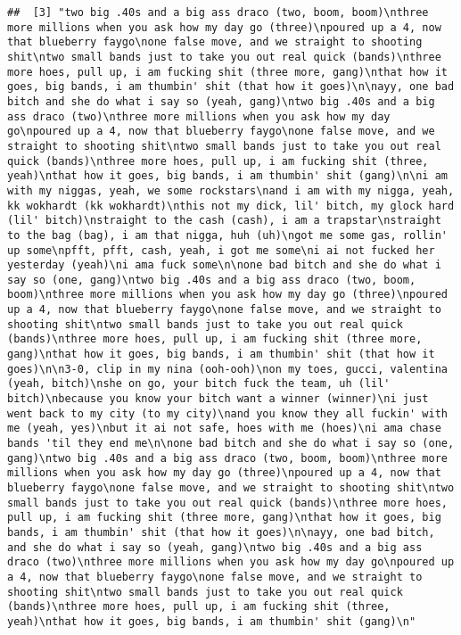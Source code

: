 \documentclass[]{article}
\begin{document}
\begin{verbatim}
##  [3] "two big .40s and a big ass draco (two, boom, boom)\nthree more millions when you ask how my day go (three)\npoured up a 4, now that blueberry faygo\none false move, and we straight to shooting shit\ntwo small bands just to take you out real quick (bands)\nthree more hoes, pull up, i am fucking shit (three more, gang)\nthat how it goes, big bands, i am thumbin' shit (that how it goes)\n\nayy, one bad bitch and she do what i say so (yeah, gang)\ntwo big .40s and a big ass draco (two)\nthree more millions when you ask how my day go\npoured up a 4, now that blueberry faygo\none false move, and we straight to shooting shit\ntwo small bands just to take you out real quick (bands)\nthree more hoes, pull up, i am fucking shit (three, yeah)\nthat how it goes, big bands, i am thumbin' shit (gang)\n\ni am with my niggas, yeah, we some rockstars\nand i am with my nigga, yeah, kk wokhardt (kk wokhardt)\nthis not my dick, lil' bitch, my glock hard (lil' bitch)\nstraight to the cash (cash), i am a trapstar\nstraight to the bag (bag), i am that nigga, huh (uh)\ngot me some gas, rollin' up some\npfft, pfft, cash, yeah, i got me some\ni ai not fucked her yesterday (yeah)\ni ama fuck some\n\none bad bitch and she do what i say so (one, gang)\ntwo big .40s and a big ass draco (two, boom, boom)\nthree more millions when you ask how my day go (three)\npoured up a 4, now that blueberry faygo\none false move, and we straight to shooting shit\ntwo small bands just to take you out real quick (bands)\nthree more hoes, pull up, i am fucking shit (three more, gang)\nthat how it goes, big bands, i am thumbin' shit (that how it goes)\n\n3-0, clip in my nina (ooh-ooh)\non my toes, gucci, valentina (yeah, bitch)\nshe on go, your bitch fuck the team, uh (lil' bitch)\nbecause you know your bitch want a winner (winner)\ni just went back to my city (to my city)\nand you know they all fuckin' with me (yeah, yes)\nbut it ai not safe, hoes with me (hoes)\ni ama chase bands 'til they end me\n\none bad bitch and she do what i say so (one, gang)\ntwo big .40s and a big ass draco (two, boom, boom)\nthree more millions when you ask how my day go (three)\npoured up a 4, now that blueberry faygo\none false move, and we straight to shooting shit\ntwo small bands just to take you out real quick (bands)\nthree more hoes, pull up, i am fucking shit (three more, gang)\nthat how it goes, big bands, i am thumbin' shit (that how it goes)\n\nayy, one bad bitch, and she do what i say so (yeah, gang)\ntwo big .40s and a big ass draco (two)\nthree more millions when you ask how my day go\npoured up a 4, now that blueberry faygo\none false move, and we straight to shooting shit\ntwo small bands just to take you out real quick (bands)\nthree more hoes, pull up, i am fucking shit (three, yeah)\nthat how it goes, big bands, i am thumbin' shit (gang)\n"                                                                                                                                                                                                                                                                                                                                                                                                                                                                                     
\end{verbatim}
\end{document}
